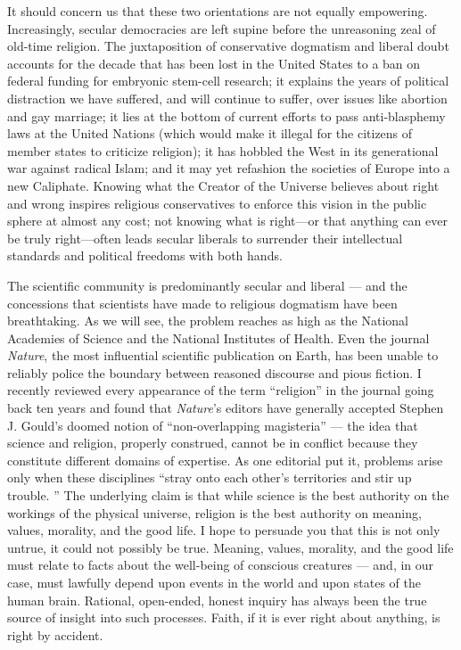\documentclass[a4paper,14pt]{extbook}
\begin{document}
It should concern us that these two orientations are not equally empowering.
Increasingly, secular democracies are left supine before the unreasoning zeal of old-time religion.
The juxtaposition of conservative dogmatism and liberal doubt accounts for the decade that has been lost in the United States to a ban on federal funding for embryonic stem-cell research;
it explains the years of political distraction we have suffered, and will continue to suffer, over issues like abortion and gay marriage;
it lies at the bottom of current efforts to pass anti-blasphemy laws at the United Nations (which would make it illegal for the citizens of member states to criticize religion);
it has hobbled the West in its generational war against radical Islam;
and it may yet refashion the societies of Europe into a new Caliphate.
Knowing what the Creator of the Universe believes about right and wrong inspires religious conservatives to enforce this vision in the public sphere at almost any cost; not knowing what is right—or that anything can ever be truly right—often leads secular liberals to surrender their intellectual standards and political freedoms with both hands.

The scientific community is predominantly secular and liberal --- and the concessions that scientists have made to religious dogmatism have been breathtaking.
As we will see, the problem reaches as high as the National Academies of Science and the National Institutes of Health.
Even the journal \textit{Nature}, the most influential scientific publication on Earth, has been unable to reliably police the boundary between reasoned discourse and pious fiction.
I recently reviewed every appearance of the term ``religion'' in the journal going back ten years and found that \textit{Nature}'s editors have generally accepted Stephen J. Gould's doomed notion of ``non-overlapping magisteria'' --- the idea that science and religion, properly construed, cannot be in conflict because they constitute different domains of expertise.
As one editorial put it, problems arise only when these disciplines ``stray onto each other's territories and stir up trouble. ''
The underlying claim is that while science is the best authority on the workings of the physical universe, religion is the best authority on meaning, values, morality, and the good life.
I hope to persuade you that this is not only untrue, it could not possibly be true.
Meaning, values, morality, and the good life must relate to facts about the well-being of conscious creatures --- and, in our case, must lawfully depend upon events in the world and upon states of the human brain.
Rational, open-ended, honest inquiry has always been the true source of insight into such processes.
Faith, if it is ever right about anything, is right by accident.
\end{document}
